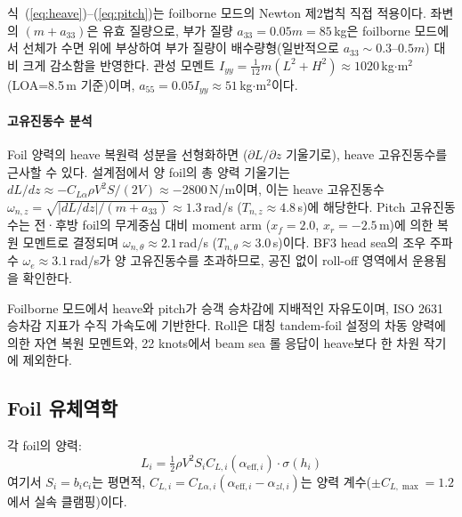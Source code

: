 \documentclass[11pt]{report}
\numberwithin{equation}{chapter}
\numberwithin{figure}{chapter}
\numberwithin{table}{chapter}
\begin{document}
식~(\ref{eq:heave})--(\ref{eq:pitch})는 foilborne 모드의 Newton 제2법칙
직접 적용이다. 좌변의 $(m + a_{33})$은 유효 질량으로,
부가 질량 $a_{33} = 0.05m = 85$\,kg은 foilborne 모드에서 선체가
수면 위에 부상하여 부가 질량이 배수량형(일반적으로 $a_{33} \sim 0.3$--$0.5 m$)
대비 크게 감소함을 반영한다.
관성 모멘트 $I_{yy} = \frac{1}{12}m(L^2 + H^2) \approx 1020$\,kg$\cdot$m$^2$
(LOA=8.5\,m 기준)이며, $a_{55} = 0.05 I_{yy} \approx 51$\,kg$\cdot$m$^2$이다.

\paragraph{고유진동수 분석}
Foil 양력의 heave 복원력 성분을 선형화하면 ($\partial L / \partial z$ 기울기로),
heave 고유진동수를 근사할 수 있다.
설계점에서 양 foil의 총 양력 기울기는 $dL/dz \approx -C_{L\alpha} \rho V^2 S / (2V) \approx
-2800$\,N/m이며, 이는 heave 고유진동수
$\omega_{n,z} = \sqrt{|dL/dz| / (m + a_{33})} \approx 1.3$\,rad/s ($T_{n,z} \approx 4.8$\,s)에
해당한다.
Pitch 고유진동수는 전·후방 foil의 무게중심 대비 moment arm
($x_f = 2.0$, $x_r = -2.5$\,m)에 의한 복원 모멘트로 결정되며
$\omega_{n,\theta} \approx 2.1$\,rad/s ($T_{n,\theta} \approx 3.0$\,s)이다.
BF3 head sea의 조우 주파수 $\omega_e \approx 3.1$\,rad/s가
양 고유진동수를 초과하므로, 공진 없이 roll-off 영역에서 운용됨을 확인한다.

Foilborne 모드에서 heave와 pitch가 승객 승차감에 지배적인 자유도이며,
ISO 2631 승차감 지표가 수직 가속도에 기반한다.
Roll은 대칭 tandem-foil 설정의 차동 양력에 의한 자연 복원 모멘트와,
22 knots에서 beam sea 롤 응답이 heave보다 한 차원 작기에 제외한다.

\subsection{Foil 유체역학}

각 foil의 양력:
\begin{equation}
  L_i = \tfrac{1}{2} \rho V^2 S_i C_{L,i}(\alpha_{\text{eff},i}) \cdot \sigma(h_i)
  \label{eq:lift}
\end{equation}
여기서 $S_i = b_i c_i$는 평면적,
$C_{L,i} = C_{L\alpha,i}(\alpha_{\text{eff},i} - \alpha_{zl,i})$는
양력 계수($\pm C_{L,\max}=1.2$에서 실속 클램핑)이다.
\end{document}
